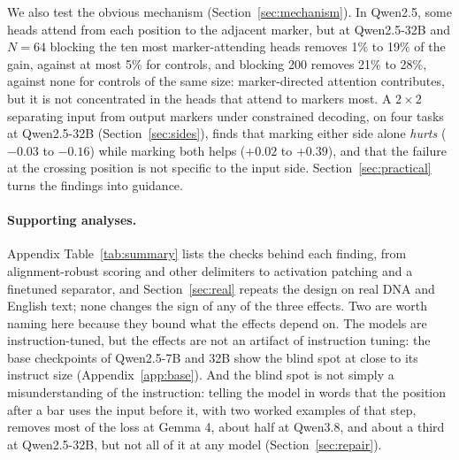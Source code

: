 \documentclass[10pt]{article} %
\begin{document}
We also test the obvious mechanism (Section~\ref{sec:mechanism}). In Qwen2.5, some heads attend from each position to the adjacent marker, but at Qwen2.5-32B and $N = 64$ blocking the ten most marker-attending heads removes 1\% to 19\% of the gain, against at most 5\% for controls, and blocking 200 removes 21\% to 28\%, against none for controls of the same size: marker-directed attention contributes, but it is not concentrated in the heads that attend to markers most. A $2 \times 2$ separating input from output markers under constrained decoding, on four tasks at Qwen2.5-32B (Section~\ref{sec:sides}), finds that marking either side alone \emph{hurts} ($-0.03$ to $-0.16$) while marking both helps ($+0.02$ to $+0.39$), and that the failure at the crossing position is not specific to the input side. Section~\ref{sec:practical} turns the findings into guidance.

\paragraph{Supporting analyses.} Appendix Table~\ref{tab:summary} lists the checks behind each finding, from alignment-robust scoring and other delimiters to activation patching and a finetuned separator, and Section~\ref{sec:real} repeats the design on real DNA and English text; none changes the sign of any of the three effects. Two are worth naming here because they bound what the effects depend on. The models are instruction-tuned, but the effects are not an artifact of instruction tuning: the base checkpoints of Qwen2.5-7B and 32B show the blind spot at close to its instruct size (Appendix~\ref{app:base}). And the blind spot is not simply a misunderstanding of the instruction: telling the model in words that the position after a bar uses the input before it, with two worked examples of that step, removes most of the loss at Gemma 4, about half at Qwen3.8, and about a third at Qwen2.5-32B, but not all of it at any model (Section~\ref{sec:repair}).
\end{document}
